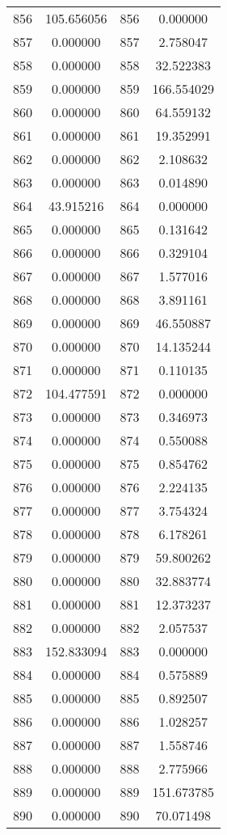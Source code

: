 \documentclass[12pt]{article}
\begin{document}
\begin{longtable}{@{}cccc@{}}
856 & 105.656056 & 856 & 0.000000 \\
857 & 0.000000 & 857 & 2.758047 \\
858 & 0.000000 & 858 & 32.522383 \\
859 & 0.000000 & 859 & 166.554029 \\
860 & 0.000000 & 860 & 64.559132 \\
861 & 0.000000 & 861 & 19.352991 \\
862 & 0.000000 & 862 & 2.108632 \\
863 & 0.000000 & 863 & 0.014890 \\
864 & 43.915216 & 864 & 0.000000 \\
865 & 0.000000 & 865 & 0.131642 \\
866 & 0.000000 & 866 & 0.329104 \\
867 & 0.000000 & 867 & 1.577016 \\
868 & 0.000000 & 868 & 3.891161 \\
869 & 0.000000 & 869 & 46.550887 \\
870 & 0.000000 & 870 & 14.135244 \\
871 & 0.000000 & 871 & 0.110135 \\
872 & 104.477591 & 872 & 0.000000 \\
873 & 0.000000 & 873 & 0.346973 \\
874 & 0.000000 & 874 & 0.550088 \\
875 & 0.000000 & 875 & 0.854762 \\
876 & 0.000000 & 876 & 2.224135 \\
877 & 0.000000 & 877 & 3.754324 \\
878 & 0.000000 & 878 & 6.178261 \\
879 & 0.000000 & 879 & 59.800262 \\
880 & 0.000000 & 880 & 32.883774 \\
881 & 0.000000 & 881 & 12.373237 \\
882 & 0.000000 & 882 & 2.057537 \\
883 & 152.833094 & 883 & 0.000000 \\
884 & 0.000000 & 884 & 0.575889 \\
885 & 0.000000 & 885 & 0.892507 \\
886 & 0.000000 & 886 & 1.028257 \\
887 & 0.000000 & 887 & 1.558746 \\
888 & 0.000000 & 888 & 2.775966 \\
889 & 0.000000 & 889 & 151.673785 \\
890 & 0.000000 & 890 & 70.071498 \\

\end{longtable}
\end{document}
